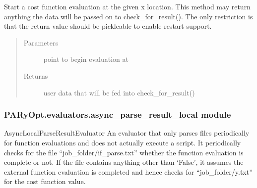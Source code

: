 \documentclass[letterpaper,12pt,english]{sphinxmanual}
\begin{document}
\begin{fulllineitems}
\begin{fulllineitems}
\label{\detokenize{PARyOpt.evaluators:PARyOpt.evaluators.async_local.AsyncLocalEvaluator.start}}
\sphinxAtStartPar
Start a cost function evaluation at the given x location.
This method may return anything \sphinxhyphen{} the data will be passed on to check\_for\_result().
The only restriction is that the return value should be pickle\sphinxhyphen{}able to enable restart support.
\begin{quote}\begin{description}
\item[{Parameters}] \leavevmode
\sphinxAtStartPar
{} \textendash{} point to begin evaluation at

\item[{Returns}] \leavevmode
\sphinxAtStartPar
user data that will be fed into check\_for\_result()

\end{description}\end{quote}

\end{fulllineitems}


\end{fulllineitems}



\subsubsection{PARyOpt.evaluators.async\_parse\_result\_local module}
\label{\detokenize{PARyOpt.evaluators:module-PARyOpt.evaluators.async_parse_result_local}}\label{\detokenize{PARyOpt.evaluators:paryopt-evaluators-async-parse-result-local-module}}
\sphinxAtStartPar
AsyncLocalParseResultEvaluator
An evaluator that only parses files periodically for function evaluations and
does not actually execute a script. It periodically checks for the file “job\_folder/if\_parse.txt” 
whether the function evaluation is complete or not. If the file contains anything other than ‘False’, 
it assumes the external function evaluation is completed and hence checks for “job\_folder/y.txt” 
for the cost function value.
\end{document}
